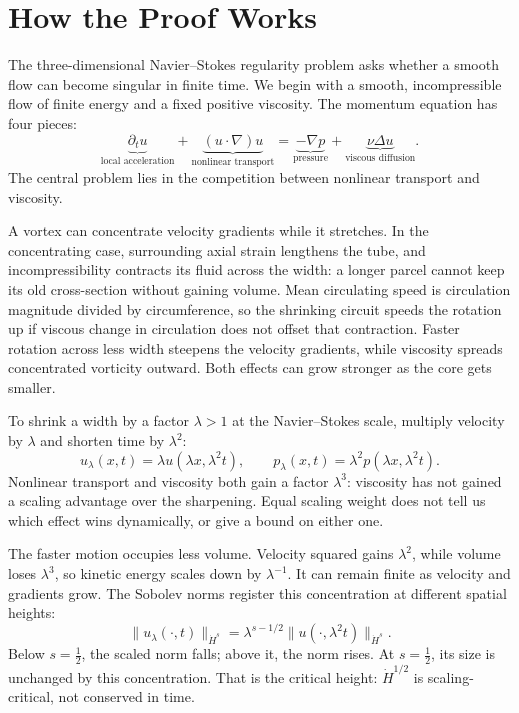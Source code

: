 \begingroup
\setlength{\parindent}{0pt}
\setlength{\parskip}{0.40\baselineskip}
\setlength{\abovedisplayskip}{6.5pt plus 1.5pt minus 1.5pt}
\setlength{\belowdisplayskip}{6.5pt plus 1.5pt minus 1.5pt}
\setlength{\jot}{4.5pt}

\section*{How the Proof Works}

The three-dimensional Navier--Stokes regularity problem asks whether a smooth
flow can become singular in finite time. We begin with a smooth,
incompressible flow of finite energy and a fixed positive viscosity. The
momentum equation has four pieces:
\[
 \underbrace{\partial_tu}_{\text{local acceleration}}
 +\underbrace{(u\!\cdot\nabla)u}_{\text{nonlinear transport}}
 =\underbrace{-\nabla p}_{\text{pressure}}
 +\underbrace{\nu\Delta u}_{\text{viscous diffusion}}.
\]
The central problem lies in the competition between nonlinear transport
and viscosity.

A vortex can concentrate velocity
gradients while it stretches.  In the concentrating case, surrounding axial
strain lengthens the tube, and incompressibility contracts its fluid across
the width: a longer parcel cannot keep its old cross-section without gaining
volume.  Mean circulating speed is circulation magnitude divided by
circumference, so the shrinking circuit speeds the rotation up if viscous
change in circulation does not offset that contraction.  Faster rotation
across less width steepens the velocity gradients, while viscosity spreads
concentrated vorticity outward.  Both effects can grow stronger as the core
gets smaller.

To shrink a width by a factor \(\lambda>1\) at the Navier--Stokes scale,
multiply velocity by \(\lambda\) and shorten time by \(\lambda^2\):
\[
 u_\lambda(x,t)=\lambda u(\lambda x,\lambda^2t),
 \qquad
 p_\lambda(x,t)=\lambda^2p(\lambda x,\lambda^2t).
\]
Nonlinear transport and viscosity both gain a factor \(\lambda^3\): viscosity
has not gained a scaling advantage over the sharpening.  Equal scaling weight
does not tell us which effect wins dynamically, or give a bound on either one.

The faster motion occupies less volume.  Velocity squared gains
\(\lambda^2\), while volume loses \(\lambda^3\), so kinetic energy scales down
by \(\lambda^{-1}\).  It can remain finite as velocity and gradients grow.
The Sobolev norms register this concentration at different spatial heights:
\[
 \|u_\lambda(\cdot,t)\|_{\dot H^s}
 =\lambda^{s-1/2}
  \|u(\cdot,\lambda^2t)\|_{\dot H^s}.
\]
Below \(s=\tfrac12\), the scaled norm falls; above it, the norm rises.  At
\(s=\tfrac12\), its size is unchanged by this concentration.  That is the
critical height: \(\dot H^{1/2}\) is scaling-critical, not conserved in time.

